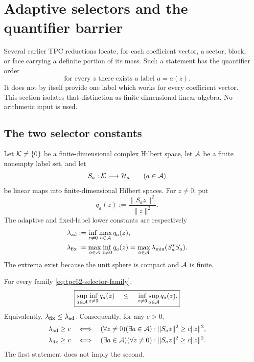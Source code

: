 \section{Adaptive selectors and the quantifier barrier}
\label{sec:tpc62-adaptive-selectors}

Several earlier TPC reductions locate, for each coefficient vector, a
sector, block, or face carrying a definite portion of its mass.  Such a
statement has the quantifier order
\[
 \text{for every }z\text{ there exists a label }a=a(z).
\]
It does not by itself provide one label which works for every coefficient
vector.  This section isolates that distinction as finite-dimensional
linear algebra.  No arithmetic input is used.

\subsection{The two selector constants}

Let \(\mathcal K\ne\{0\}\) be a finite-dimensional complex Hilbert space, let
\(\mathcal A\) be a finite nonempty label set, and let
\begin{equation}
 S_a:\mathcal K\longrightarrow\mathcal H_a
 \qquad(a\in\mathcal A)
 \label{eq:tpc62-selector-family}
\end{equation}
be linear maps into finite-dimensional Hilbert spaces.  For \(z\ne0\),
put
\begin{equation}
 q_a(z):=\frac{\|S_az\|^2}{\|z\|^2}.
 \label{eq:tpc62-selector-Rayleigh}
\end{equation}
The adaptive and fixed-label lower constants are respectively
\begin{align}
 \lambda_{\rm ad}
 &:=\inf_{z\ne0}\max_{a\in\mathcal A}q_a(z),
 \label{eq:tpc62-adaptive-constant}\\
 \lambda_{\rm fix}
 &:=\max_{a\in\mathcal A}\inf_{z\ne0}q_a(z)
   =\max_{a\in\mathcal A}\lambda_{\min}(S_a^*S_a).
 \label{eq:tpc62-fixed-constant}
\end{align}
The extrema exist because the unit sphere is compact and \(\mathcal A\) is
finite.

\begin{theorem}
\label{thm:tpc62-selector-minimax}
For every family \eqref{eq:tpc62-selector-family},
\begin{equation}
 \boxed{
 \sup_{a\in\mathcal A}\inf_{z\ne0}q_a(z)
 \quad\le\quad
 \inf_{z\ne0}\sup_{a\in\mathcal A}q_a(z).}
 \label{eq:tpc62-minimax-order}
\end{equation}
Equivalently, \(\lambda_{\rm fix}\le\lambda_{\rm ad}\).  Consequently,
for any \(c>0\),
\begin{align}
 \lambda_{\rm ad}\ge c
 &\quad\Longleftrightarrow\quad
 (\forall z\ne0)(\exists a\in\mathcal A):
 \|S_az\|^2\ge c\|z\|^2,
 \label{eq:tpc62-forall-exists}\\
 \lambda_{\rm fix}\ge c
 &\quad\Longleftrightarrow\quad
 (\exists a\in\mathcal A)(\forall z\ne0):
 \|S_az\|^2\ge c\|z\|^2.
 \label{eq:tpc62-exists-forall}
\end{align}
The first statement does not imply the second.
\end{theorem}

